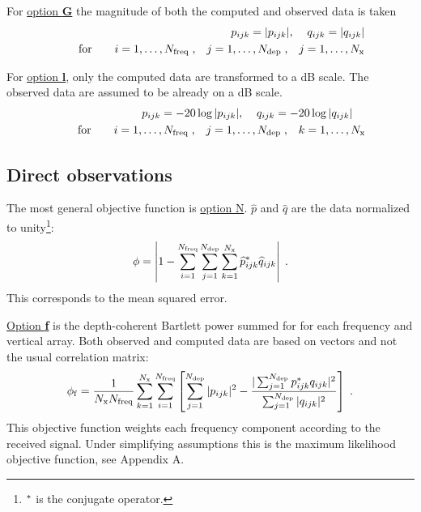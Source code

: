 \documentclass{saclantc}
\begin{document}
For \underline{option {\bf G}} the magnitude of both the computed and
observed data is taken
\begin{eqnarray}
p_{ijk}= |p_{ijk} | , \;\;\;\;
q_{ijk}= |q_{ijk} | \\
\qquad \mbox{for}\qquad  
i=1,\ldots , N_{\rm freq} \; , \;\;\; j=1,\ldots ,N_{\rm dep} \; , \;\;\;
j=1,\ldots ,N_{\rm x}
\end{eqnarray}

For \underline{option {\bf l}}, only the computed 
 data are transformed to a dB scale. The observed data are assumed
to be already on a dB scale.
\begin{eqnarray}
p_{ijk}= -20 \log |p_{ijk} | ,\;\;\;\;
q_{ijk}= -20 \log |q_{ijk} |\;\;\;\; \\
\qquad \mbox{for}\qquad  
i=1,\ldots , N_{\rm freq} \; , \;\;\; j=1,\ldots ,N_{\rm dep} \; , \;\;\;
k=1,\ldots ,N_{\rm x}
\end{eqnarray}

\subsection{Direct observations}

The most general objective function is \underline{option N}.
$\widehat{p}$ and $\widehat{q}$ are the data normalized to 
unity\footnote{$^{\rm *} $ is the conjugate operator.}:
\begin{equation}
\phi= \left|1- \sum^{N _{\rm freq}}_{i=1} \sum^{N _{\rm dep}}_{j=1} \sum^{N_{ \rm x}}_{k=1}
\widehat{p}_{ijk}^{\rm *} \widehat{q}_{ijk}\right|\; .
\label{eq:obj1}
\end{equation}
This corresponds to the mean squared error.


\underline{Option {\bf f}}
is the depth-coherent Bartlett power summed for  for each frequency and vertical array. 
Both observed and computed data  are based on 
vectors and not  the usual correlation matrix: 
\begin{equation}
 \phi_{\rm f}= \frac{1}{N_{\rm x}{N _{\rm freq}}}
  \sum^{N_{\rm x}}_{k=1} \sum^{N _{\rm freq}}_{i=1} \left[
   \sum^{N _{\rm dep}}_{j=1} |{p}_{ijk}|^2 -
{{|\sum^{N _{\rm dep}}_{j=1} {p}_{ijk}^{\rm *} {q}_{ijk}|^2}
      \over {
             \sum^{N _{\rm dep}}_{j=1} |{q}_{ijk}|^2}}\right]
  \; .
\label{eq:objf}
\end{equation}
This objective function weights each frequency component according to
the received signal. Under simplifying assumptions this is the maximum
likelihood objective function, see Appendix A.
\end{document}
